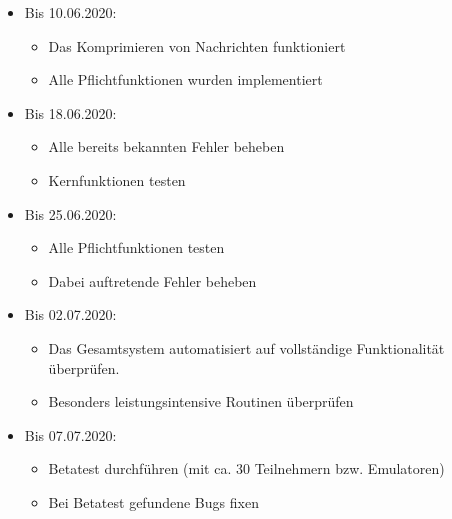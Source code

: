 \begin{itemize}
	\item Bis 10.06.2020:
	\begin{itemize}
		\item Das Komprimieren von Nachrichten funktioniert
		\item Alle Pflichtfunktionen wurden implementiert
	\end{itemize}	
	
	\item Bis 18.06.2020:
	\begin{itemize}
		\item Alle bereits bekannten Fehler beheben
		\item Kernfunktionen testen
	\end{itemize}
	\item Bis 25.06.2020:
	\begin{itemize}
		\item Alle Pflichtfunktionen testen
		\item Dabei auftretende Fehler beheben
	\end{itemize}
	\item Bis 02.07.2020:
	\begin{itemize}
	\item Das Gesamtsystem automatisiert auf vollständige Funktionalität überprüfen.
		\item Besonders leistungsintensive Routinen überprüfen
	\end{itemize}
	\item Bis 07.07.2020:
	\begin{itemize}
		\item Betatest durchführen (mit ca. 30 Teilnehmern bzw. Emulatoren)
		\item Bei Betatest gefundene Bugs fixen
	\end{itemize}
	
\end{itemize}
